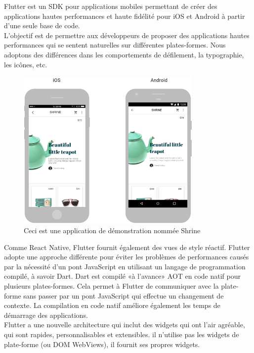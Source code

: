 Flutter est un SDK pour applications mobiles permettant de créer des applications hautes performances et haute fidélité pour iOS et Android à partir d'une seule base de code\cite{noauthor_technical_nodate}.\medskip \\
\tab L'objectif est de permettre aux développeurs de proposer des applications hautes performances qui se sentent naturelles sur différentes plates-formes. Nous adoptons des différences dans les comportements de défilement, la typographie, les icônes, etc.\bigskip

\begin{figure}[h]
	\begin{center}
		\includegraphics[width=9cm]{Images/chapter2/flutter_android_ios.png}
		\caption{{\footnotesize Ceci est une application de démonstration nommée Shrine\cite{noauthor_technical_nodate}}}
	\end{center}
\end{figure}

\tab Comme React Native, Flutter fournit également des vues de style réactif. Flutter adopte une approche différente pour éviter les problèmes de performances causés par la nécessité d'un pont JavaScript en utilisant un langage de programmation compilé, à savoir Dart. Dart est compilé «à l'avance» \acrshort{AOT} en code natif pour plusieurs plates-formes. Cela permet à Flutter de communiquer avec la plate-forme sans passer par un pont JavaScript qui effectue un changement de contexte. La compilation en code natif améliore également les temps de démarrage des applications.\medskip \\
\tab Flutter a une nouvelle architecture qui inclut des widgets qui ont l’air agréable, qui sont rapides, personnalisables et extensibles. il n'utilise pas les widgets de plate-forme (ou DOM WebViews), il fournit ses propres widgets.

